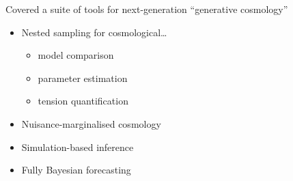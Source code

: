 \documentclass[aspectratio=169]{beamer}
\begin{document}
\begin{frame}
    Covered a suite of tools for next-generation ``generative cosmology''
    \begin{itemize}
        \item Nested sampling for cosmological\ldots
            \begin{itemize}
                \item model comparison
                \item parameter estimation
                \item tension quantification
            \end{itemize}
        \item Nuisance-marginalised cosmology
        \item Simulation-based inference
        \item Fully Bayesian forecasting
    \end{itemize}
\end{frame}
\end{document}
